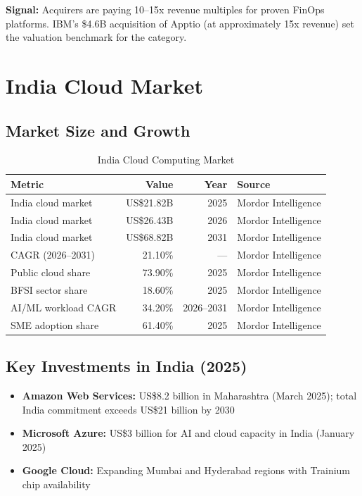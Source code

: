 \documentclass[a4paper,11pt]{article}
\begin{document}
\textbf{Signal:} Acquirers are paying 10--15x revenue multiples for proven FinOps platforms. IBM's \$4.6B acquisition of Apptio (at approximately 15x revenue) set the valuation benchmark for the category.

\section{India Cloud Market}

\subsection{Market Size and Growth}

\begin{table}[H]
\centering
\begin{tabularx}{\textwidth}{Xrrl}
\toprule
\textbf{Metric} & \textbf{Value} & \textbf{Year} & \textbf{Source} \\
\midrule
India cloud market & US\$21.82B & 2025 & Mordor Intelligence \\
India cloud market & US\$26.43B & 2026 & Mordor Intelligence \\
India cloud market & US\$68.82B & 2031 & Mordor Intelligence \\
CAGR (2026--2031) & 21.10\% & --- & Mordor Intelligence \\
Public cloud share & 73.90\% & 2025 & Mordor Intelligence \\
BFSI sector share & 18.60\% & 2025 & Mordor Intelligence \\
AI/ML workload CAGR & 34.20\% & 2026--2031 & Mordor Intelligence \\
SME adoption share & 61.40\% & 2025 & Mordor Intelligence \\
\bottomrule
\end{tabularx}
\caption{India Cloud Computing Market}
\end{table}

\subsection{Key Investments in India (2025)}

\begin{itemize}[itemsep=1mm]
    \item \textbf{Amazon Web Services:} US\$8.2 billion in Maharashtra (March 2025); total India commitment exceeds US\$21 billion by 2030
    \item \textbf{Microsoft Azure:} US\$3 billion for AI and cloud capacity in India (January 2025)
    \item \textbf{Google Cloud:} Expanding Mumbai and Hyderabad regions with Trainium chip availability
\end{itemize}
\end{document}
